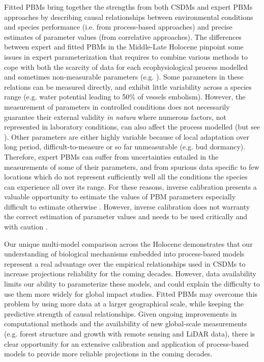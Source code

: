 \documentclass[9pt,twocolumn,twoside]{pnas-new}
\begin{document}
Fitted PBMs bring together the strengths from both CSDMs and expert PBMs approaches by describing causal relationships between environmental conditions and species performance (i.e. from process-based approaches) and precise estimates of parameter values (from correlative approaches). The differences between expert and fitted PBMs in the Middle-Late Holocene pinpoint some issues in expert parameterization that requires to combine various methods to cope with both the scarcity of data for each ecophysiological process modelled and sometimes non-measurable parameters (e.g. \cite{DeCaceres2023}).  Some parameters in these relations can be measured directly, and exhibit little variability across a species range (e.g. water potential leading to 50\% of vessels embolism). However, the measurement of parameters in controlled conditions does not necessarily guarantee their external validity \emph{in natura} \cite{Asse2020} where numerous factors, not represented in laboratory conditions, can also affect the process modelled (but see \cite{Satake2013}). Other parameters are either highly variable because of local adaptation over long period,  difficult-to-measure or so far unmeasurable (e.g. bud dormancy). Therefore, expert PBMs can suffer from uncertainties entailed in the measurements of some of their parameters, and from spurious data specific to few locations which do not represent sufficiently well all the conditions the species can experience all over its range. For these reasons, inverse calibration presents a valuable opportunity to estimate the values of PBM parameters especially difficult to estimate otherwise \cite{Evans2016, Hartig2014}. However, inverse calibration does not warranty the correct estimation of parameter values and needs to be used critically and with caution \cite{VanderMeersch2023}. 

Our unique multi-model comparison across the Holocene demonstrates that our understanding of biological mechanisms embedded into process-based models represent a real advantage over the empirical relationships used in CSDMs to increase projections reliability for the coming decades. However, data availability limits our ability to parameterize these models, and could explain the difficulty to use them more widely for global impact studies. Fitted PBMs may overcome this problem by using more data at a larger geographical scale, while keeping the predictive strength of causal relationships. Given ongoing improvements in computational methods and the availability of new global-scale measurements (e.g. forest structure and growth with remote sensing and LiDAR data), there is clear opportunity for an extensive calibration and application of process-based models to provide more reliable projections in the coming decades.
\end{document}
